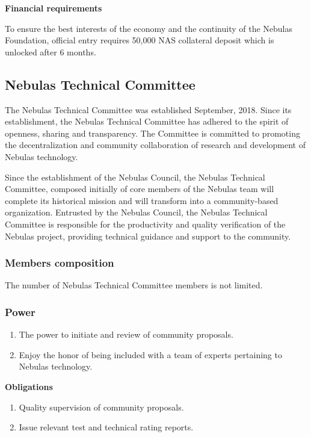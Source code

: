 \vspace{2em}

\textbf{Financial requirements}

To ensure the best interests of the economy and the continuity of the Nebulas Foundation, official entry requires 50,000 NAS collateral deposit which is unlocked after 6 months.

\subsection{Nebulas Technical Committee}

The Nebulas Technical Committee was established September, 2018. Since its establishment, the Nebulas Technical Committee has  adhered to the spirit of openness, sharing and transparency. The Committee is committed to promoting the decentralization and community collaboration of research and development of Nebulas technology. 

Since the establishment of the Nebulas Council, the Nebulas Technical Committee, composed initially of core members of the Nebulas team will complete its historical mission and will transform into a community-based organization. Entrusted by the Nebulas Council, the Nebulas Technical Committee is responsible for the productivity and quality verification of the Nebulas project, providing technical guidance and support to the community.

\subsubsection{Members composition}

The number of Nebulas Technical Committee members is not limited.

\subsubsection{Power}

\begin{enumerate}
	\item The power to initiate and review of community proposals.
	\item Enjoy the honor of being included with a team of experts pertaining to Nebulas technology.
\end{enumerate}

\textbf{Obligations}

\begin{enumerate}
	\item Quality supervision of community proposals.
	\item Issue relevant test and technical rating reports.
\end{enumerate}

